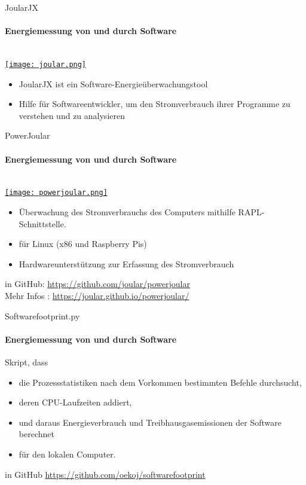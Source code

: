 \begin{frame}{JoularJX}
\framesubtitle{ Energiemessung von und durch Software}
   ~\\\hspace*{\fill}
     \href{https://www.noureddine.org/research/joular/joularjx}%
		      {\texttt{[image: joular.png]}}

\begin{itemize}
	\item JoularJX ist ein Software-Energieüberwachungstool
  \item Hilfe für  Softwareentwickler, um den Stromverbrauch 
ihrer Programme zu verstehen und zu analysieren

\end{itemize}
\end{frame}

\begin{frame}{PowerJoular}
\framesubtitle{ Energiemessung von und durch Software}
   ~\\\hspace*{\fill}
	\href{https://www.noureddine.org/research/joular/powerjoular}
	     {\texttt{[image: powerjoular.png]}}

\begin{itemize}
	\item Überwachung des Stromverbrauchs des Computers mithilfe RAPL-Schnittstelle.
	\item für Linux (x86 und Raspberry Pis)
	\item Hardwareunterstützung zur Erfassung des Stromverbrauch 
\end{itemize}
in GitHub: \href{https://github.com/joular/powerjoular}{https://github.com/joular/powerjoular}\\
Mehr Infos : \href{https://joular.github.io/powerjoular/}{https://joular.github.io/powerjoular/}

\hspace*{\fill} \cite{noureddine-ie-2022}
\end{frame}

\begin{frame}{Softwarefootprint.py}
\framesubtitle{ Energiemessung von und durch Software}
Skript, dass
\begin{itemize}
	\item   die Prozessstatistiken nach dem Vorkommen  bestimmten Befehle durchsucht,
	\item  deren CPU-Laufzeiten addiert,
	\item  und daraus Energieverbrauch und Treibhausgasemissionen der Software berechnet
	\item für den lokalen Computer.
\end{itemize}

in GitHub \href{https://github.com/oekoj/softwarefootprint}{https://github.com/oekoj/softwarefootprint}
\end{frame}

